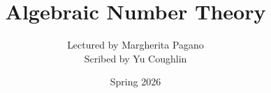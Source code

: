 \documentclass{article}
\begin{document}
\title{Algebraic Number Theory}
\author{Lectured by Margherita Pagano \\
Scribed by Yu Coughlin}
\date{Spring 2026}

\maketitle

\tableofcontents
\end{document}
